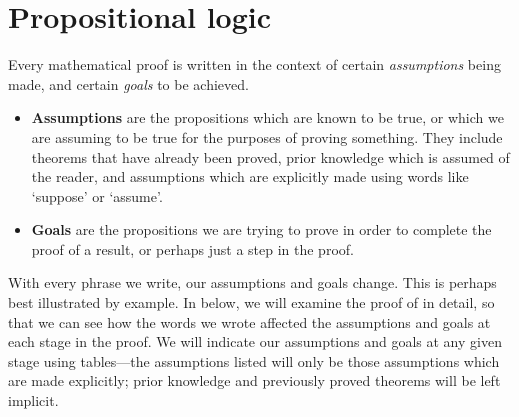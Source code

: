 \section{Propositional logic}

Every mathematical proof is written in the context of certain \textit{assumptions} being made, and certain \textit{goals} to be achieved.

\begin{itemize}
\item \textbf{Assumptions} are the propositions which are known to be true, or which we are assuming to be true for the purposes of proving something. They include theorems that have already been proved, prior knowledge which is assumed of the reader, and assumptions which are explicitly made using words like `suppose' or `assume'.
\item \textbf{Goals} are the propositions we are trying to prove in order to complete the proof of a result, or perhaps just a step in the proof.
\end{itemize}

With every phrase we write, our assumptions and goals change. This is perhaps best illustrated by example. In  below, we will examine the proof of  in detail, so that we can see how the words we wrote affected the assumptions and goals at each stage in the proof. We will indicate our assumptions and goals at any given stage using tables---the assumptions listed will only be those assumptions which are made explicitly; prior knowledge and previously proved theorems will be left implicit.

